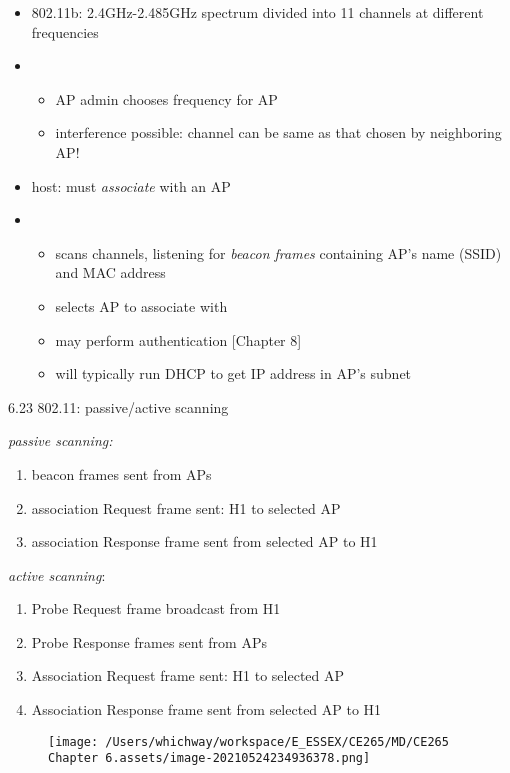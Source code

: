 \documentclass[
]{article}
\begin{document}
\begin{itemize}
\item
  802.11b: 2.4GHz-2.485GHz spectrum divided into 11 channels at
  different frequencies
\item
  \begin{itemize}
  \item
    AP admin chooses frequency for AP
  \item
    interference possible: channel can be same as that chosen by
    neighboring AP!
  \end{itemize}
\item
  host: must \emph{associate} with an AP
\item
  \begin{itemize}
  \item
    scans channels, listening for \emph{beacon frames} containing AP's
    name (SSID) and MAC address
  \item
    selects AP to associate with
  \item
    may perform authentication {[}Chapter 8{]}
  \item
    will typically run DHCP to get IP address in AP's subnet
  \end{itemize}
\end{itemize}

6.23 802.11: passive/active scanning

\emph{passive scanning:}

\begin{enumerate}
\def\labelenumi{\arabic{enumi}.}
\item
  beacon frames sent from APs
\item
  association Request frame sent: H1 to selected AP
\item
  association Response frame sent from selected AP to H1
\end{enumerate}

\emph{active scanning}:

\begin{enumerate}
\def\labelenumi{\arabic{enumi}.}
\item
  Probe Request frame broadcast from H1
\item
  Probe Response frames sent from APs
\item
  Association Request frame sent: H1 to selected AP
\item
  Association Response frame sent from selected AP to H1
\end{enumerate}

\begin{figure}
\centering
\texttt{[image: /Users/whichway/workspace/E\_ESSEX/CE265/MD/CE265 Chapter 6.assets/image-20210524234936378.png]}
\caption{}
\end{figure}
\end{document}
